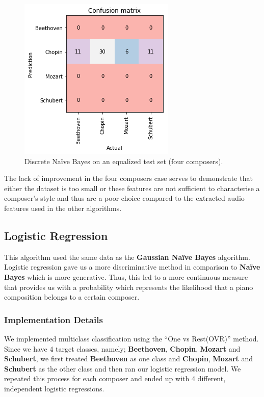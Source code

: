 \documentclass[11pt]{article}
\makeatletter
\def\maxwidth{\ifdim\Gin@nat@width>\linewidth\linewidth
    \else\Gin@nat@width\fi}
\let\Oldincludegraphics\includegraphics
\renewcommand{\includegraphics}[1]{\Oldincludegraphics[width=.8\maxwidth]{#1}}
\makeatother
\begin{document}
\begin{figure}[htbp]
\centering
\includegraphics{report/plots/confusion_discNB_04.png}
\caption{Discrete Naïve Bayes on an equalized test set (four
composers).}
\end{figure}

The lack of improvement in the four composers case serves to demonstrate
that either the dataset is too small or these features are not
sufficient to characterise a composer's style and thus are a poor choice
compared to the extracted audio features used in the other algorithms.

    \subsection{Logistic Regression}\label{logistic-regression}

This algorithm used the same data as the \textbf{Gaussian Naïve Bayes}
algorithm. Logistic regression gave us a more discriminative method in
comparison to \textbf{Naïve Bayes} which is more generative. Thus, this
led to a more continuous measure that provides us with a probability
which represents the likelihood that a piano composition belongs to a
certain composer.

\subsubsection{Implementation Details}\label{implementation-details}

We implemented multiclass classification using the ``One vs Rest(OVR)''
method. Since we have 4 target classes, namely; \textbf{Beethoven},
\textbf{Chopin}, \textbf{Mozart} and \textbf{Schubert}, we first treated
\textbf{Beethoven} as one class and \textbf{Chopin}, \textbf{Mozart} and
\textbf{Schubert} as the other class and then ran our logistic
regression model. We repeated this process for each composer and ended
up with 4 different, independent logistic regressions.
\end{document}
